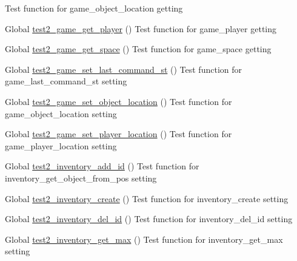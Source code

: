 \begin{DoxyRefList}
%
Test function for game\+\_\+object\+\_\+location getting  
\item[Global \mbox{\hyperlink{game__test_8c_a8a8b3634c39499b44a9211f8f1bf06ba}{test2\+\_\+game\+\_\+get\+\_\+player}} ()]\label{test__test000036}%
%
Test function for game\+\_\+player getting  
\item[Global \mbox{\hyperlink{game__test_8c_a16d48c8d8035f259dedc9460c636e8c5}{test2\+\_\+game\+\_\+get\+\_\+space}} ()]\label{test__test000027}%
%
Test function for game\+\_\+space getting  
\item[Global \mbox{\hyperlink{game__test_8c_a5a0c227e81977caeac8791cb7d6e478f}{test2\+\_\+game\+\_\+set\+\_\+last\+\_\+command\+\_\+st}} ()]\label{test__test000049}%
%
Test function for game\+\_\+last\+\_\+command\+\_\+st setting  
\item[Global \mbox{\hyperlink{game__test_8c_a2bee8c4494438aa5cdc301ca6ef40e88}{test2\+\_\+game\+\_\+set\+\_\+object\+\_\+location}} ()]\label{test__test000040}%
%
Test function for game\+\_\+object\+\_\+location setting  
\item[Global \mbox{\hyperlink{game__test_8c_ab3df4712338838d4037ac909629aa69d}{test2\+\_\+game\+\_\+set\+\_\+player\+\_\+location}} ()]\label{test__test000038}%
%
Test function for game\+\_\+player\+\_\+location setting  
\item[Global \mbox{\hyperlink{inventory__test_8c_abfb3407529398f76999549e42d567a7e}{test2\+\_\+inventory\+\_\+add\+\_\+id}} ()]\label{test__test000058}%
%
Test function for inventory\+\_\+get\+\_\+object\+\_\+from\+\_\+pos setting  
\item[Global \mbox{\hyperlink{inventory__test_8c_a73a6080c360a8870c4ffc734e989c8b3}{test2\+\_\+inventory\+\_\+create}} ()]\label{test__test000054}%
%
Test function for inventory\+\_\+create setting  
\item[Global \mbox{\hyperlink{inventory__test_8c_a52850510d17b4f1c105123fdd9e93906}{test2\+\_\+inventory\+\_\+del\+\_\+id}} ()]\label{test__test000060}%
%
Test function for inventory\+\_\+del\+\_\+id setting  
\item[Global \mbox{\hyperlink{inventory__test_8c_abddcab377edb21235d6746668597fde2}{test2\+\_\+inventory\+\_\+get\+\_\+max}} ()]\label{test__test000064}%
%
Test function for inventory\+\_\+get\+\_\+max setting  

\end{DoxyRefList}
